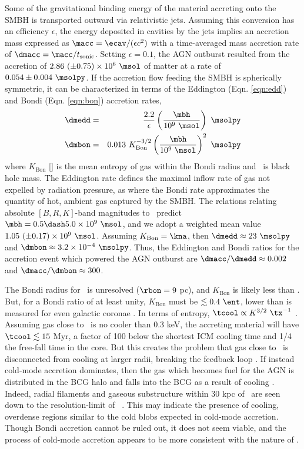 \documentclass[useAMS,usenatbib]{mn2e}
\begin{document}
Some of the gravitational binding energy of the material accreting
onto the SMBH is transported outward via relativistic jets. Assuming
this conversion has an efficiency $\epsilon$, the energy deposited in
cavities by the jets implies an accretion mass expressed as $\macc =
\ecav/(\epsilon c^2)$ with a time-averaged mass accretion rate of
$\dmacc = \macc/t_{\mathrm{sonic}}$. Setting $\epsilon = 0.1$, the AGN
outburst resulted from the accretion of $2.86 ~(\pm 0.75) \times
10^{6} ~\msol$ of matter at a rate of $0.054 \pm 0.004 ~\msolpy$. If
the accretion flow feeding the SMBH is spherically symmetric, it can
be characterized in terms of the Eddington (Eqn. \ref{eqn:edd}) and
Bondi (Eqn. \ref{eqn:bon}) accretion rates,
\begin{eqnarray}
  \dmedd &=& \frac{2.2}{\epsilon} \left(\frac{\mbh}{10^9~\msol}\right)
  ~\msolpy  \label{eqn:edd}\\
  \dmbon &=& 0.013 ~K_{\mathrm{Bon}}^{-3/2} \left(\frac{\mbh}{10^9
    ~\msol}\right)^{2} ~\msolpy \label{eqn:bon}
\end{eqnarray}
where $K_{\mathrm{Bon}}$ [\ent] is the mean entropy of gas within the
Bondi radius and \mbh\ is black hole mass. The Eddington rate defines
the maximal inflow rate of gas not expelled by radiation pressure, as
where the Bondi rate approximates the quantity of hot, ambient gas
captured by the SMBH. The \citet{2007MNRAS.379..711G} relations
relating absolute $[B,R,K]$-band magnitudes to \mbh\ predict $\mbh =
0.5 \dash 5.0 \times 10^9 ~\msol$, and we adopt a weighted mean value
$1.05 ~(\pm 0.17) \times 10^9 ~\msol$. Assuming $K_{\mathrm{Bon}} =
\kna$, then $\dmedd \approx 23 ~\msolpy$ and $\dmbon \approx 3.2
\times 10^{-4} ~\msolpy$. Thus, the Eddington and Bondi ratios for the
accretion event which powered the AGN outburst are $\dmacc/\dmedd
\approx 0.002$ and $\dmacc/\dmbon \approx 300$.

The Bondi radius for \irs\ is unresolved ($\rbon = 9$ pc), and
$K_{\mathrm{Bon}}$ is likely less than \kna. But, for a Bondi ratio of
at least unity, $K_{\mathrm{Bon}}$ must be $\la 0.4 ~\ent$, lower than
is measured for even galactic coronae \citep{coronae}. In terms of
entropy, $\tcool \propto K^{3/2} ~\tx^{-1}$ \citep{d06}. Assuming gas
close to \rbon\ is no cooler than 0.3 keV, the accreting material will
have $\tcool \la 15$ Myr, a factor of 100 below the shortest ICM
cooling time and 1/4 the free-fall time in the core. But this creates
the problem that gas close to \rbon\ is disconnected from cooling at
larger radii, breaking the feedback loop
\citep{2006NewA...12...38S}. If instead cold-mode accretion dominates,
then the gas which becomes fuel for the AGN is distributed in the BCG
halo and falls into the BCG as a result of cooling \citep{pizzolato05,
  2010arXiv1003.4181P}. Indeed, radial filaments and gaseous
substructure within 30 kpc of \irs\ are seen down to the
resolution-limit of \hst\ \citep{1999Ap&SS.266..113A}. This may
indicate the presence of cooling, overdense regions similar to the
cold blobs expected in cold-mode accretion. Though Bondi accretion
cannot be ruled out, it does not seem viable, and the process of
cold-mode accretion appears to be more consistent with the nature of
\irs.
\end{document}

